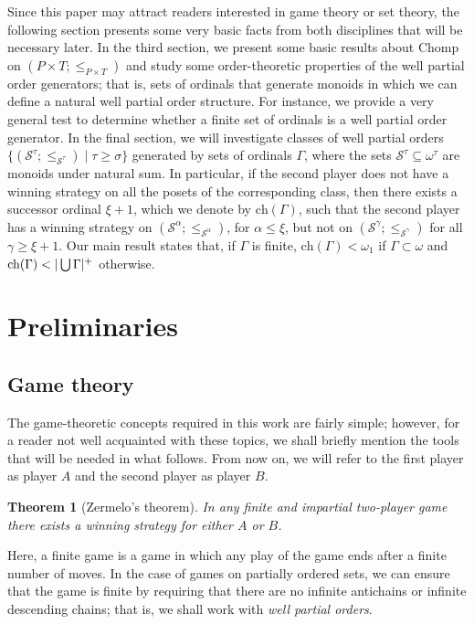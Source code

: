 \documentclass[reqno]{amsart}
\newtheorem{theorem}{Theorem}[section]
\theoremstyle{definition}
\theoremstyle{definition}
\theoremstyle{plain} %
\begin{document}
Since this paper may attract readers interested in game theory or set theory, the following section presents some very basic facts from both disciplines that will be necessary later. In the third section, we present some basic results about Chomp on $(P\times T;\leq_{P\times T})$ and study some order-theoretic properties of the well partial order generators; that is, sets of ordinals that generate monoids in which we can define a natural well partial order structure. For instance, we provide a very general test to determine whether a finite set of ordinals is a well partial order generator. In the final section, we will investigate classes of well partial orders $\{ (\mathcal{S}^\tau;\leq_{\mathcal{S}^\tau}) \mid\tau\geq\sigma\}$ generated by sets of ordinals $\Gamma$, where the sets $\mathcal{S}^\tau\subseteq\omega^\tau$ are monoids under natural sum. In particular, if the second player does not have a winning strategy on all the posets of the corresponding class, then there exists a successor ordinal $\xi+1$, which we denote by $\text{ch}(\Gamma)$, such that the second player has a winning strategy on $(\mathcal{S}^\alpha;\leq_{\mathcal{S}^\alpha})$, for $\alpha\leq\xi$, but not on $(\mathcal{S}^{\gamma};\leq_{\mathcal{S}^{\gamma}})$ for all $\gamma\geq\xi+1$. Our main result states that, if $\Gamma$ is finite, $\text{ch}(\Gamma)<\omega_1$ if $\Gamma\subset\omega$ and $\textnormal{ch}(\Gamma)<|\bigcup\Gamma|^+$ otherwise.
\section{Preliminaries}
\subsection{Game theory} The game-theoretic concepts required in this work are fairly simple; however, for a reader not well acquainted with these topics, we shall briefly mention the tools that will be needed in what follows. From now on, we will refer to the first player as player $A$ and the second player as player $B$.
\begin{theorem}[Zermelo's theorem]
    In any finite and impartial two-player game there exists a winning strategy for either $A$ or $B$.
\end{theorem} Here, a finite game is a game in which any play of the game ends after a finite number of moves. In the case of games on partially ordered sets, we can ensure that the game is finite by requiring that there are no infinite antichains or infinite descending chains; that is, we shall work with \textit{well partial orders}.
\end{document}
